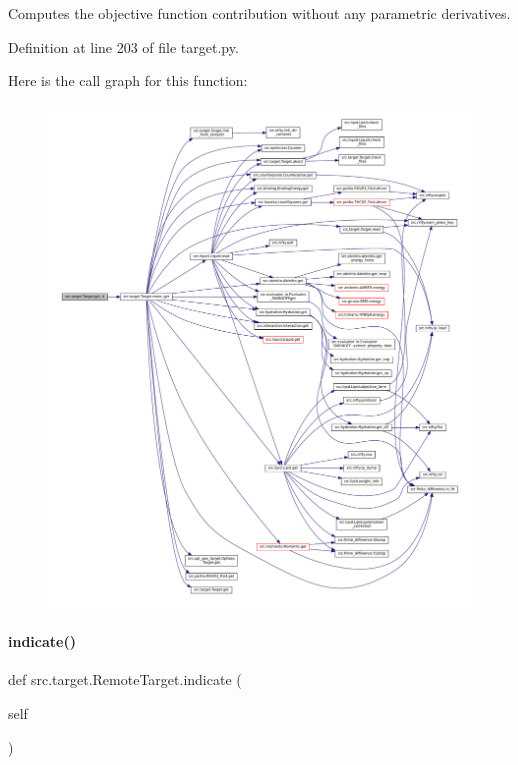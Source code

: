 Computes the objective function contribution without any parametric derivatives. 



Definition at line 203 of file target.\+py.

Here is the call graph for this function\+:
\nopagebreak
\begin{figure}[H]
\begin{center}
\leavevmode
\includegraphics[width=350pt]{classsrc_1_1target_1_1Target_acd106ed266687c08937944d4c0d17d87_cgraph}
\end{center}
\end{figure}
\mbox{\label{classsrc_1_1target_1_1RemoteTarget_abe88774b9f4627698672fb68e8caf057}} 
\paragraph{\texorpdfstring{indicate()}{indicate()}}
{\footnotesize\ttfamily def src.\+target.\+Remote\+Target.\+indicate (\begin{DoxyParamCaption}\item[{}]{self }\end{DoxyParamCaption})}



